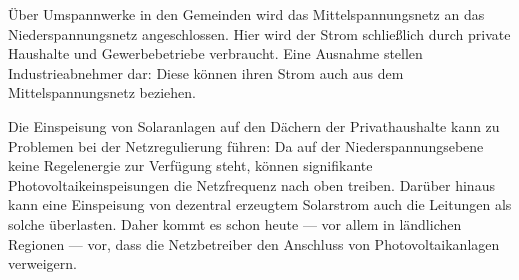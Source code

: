 \documentclass[logo]{fhgart}
\begin{document}
\begin{enumerate}
    Über Umspannwerke in den Gemeinden wird das Mittelspannungsnetz an
    das Niederspannungsnetz angeschlossen. Hier wird der Strom
    schließlich durch private Haushalte und Gewerbebetriebe verbraucht.
    Eine Ausnahme stellen Industrieabnehmer dar: Diese können ihren
    Strom auch aus dem Mittelspannungsnetz beziehen.

    Die Einspeisung von Solaranlagen auf den Dächern der Privathaushalte
    kann zu Problemen bei der Netzregulierung führen: Da auf der
    Niederspannungsebene keine Regelenergie zur Verfügung steht, können
    signifikante Photovoltaikeinspeisungen die Netzfrequenz nach oben
    treiben. Darüber hinaus kann eine Einspeisung von dezentral
    erzeugtem Solarstrom auch die Leitungen als solche überlasten.
    Daher kommt es schon heute --- vor allem in ländlichen Regionen ---
    vor, dass die Netzbetreiber den Anschluss von Photovoltaikanlagen
    verweigern.
   

\end{enumerate}
\end{document}
